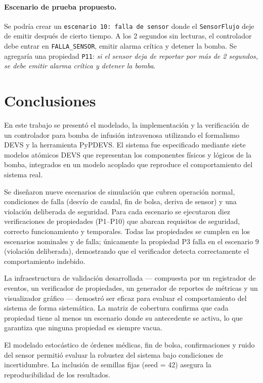 \documentclass[12pt,a4paper]{article}
\begin{document}
\paragraph{Escenario de prueba propuesto.}  Se podría crear un
\texttt{escenario 10: falla de sensor} donde el \texttt{SensorFlujo}
deje de emitir después de cierto tiempo.  A los 2 segundos sin
lecturas, el controlador debe entrar en \texttt{FALLA\_SENSOR},
emitir alarma crítica y detener la bomba.  Se agregaría una propiedad
\texttt{P11}: \textit{si el sensor deja de reportar por más de 2
segundos, se debe emitir alarma crítica y detener la bomba}.

\section{Conclusiones}

En este trabajo se presentó el modelado, la implementación y la
verificación de un controlador para bomba de infusión intravenosa
utilizando el formalismo DEVS y la herramienta PyPDEVS.  El sistema
fue especificado mediante siete modelos atómicos DEVS que representan
los componentes físicos y lógicos de la bomba, integrados en un modelo
acoplado que reproduce el comportamiento del sistema real.

Se diseñaron nueve escenarios de simulación que cubren operación
normal, condiciones de falla (desvío de caudal, fin de bolsa, deriva
de sensor) y una violación deliberada de seguridad.  Para cada
escenario se ejecutaron diez verificaciones de propiedades (P1--P10)
que abarcan requisitos de seguridad, correcto funcionamiento y
temporales.  Todas las propiedades se cumplen en los escenarios
nominales y de falla; únicamente la propiedad P3 falla en el
escenario 9 (violación deliberada), demostrando que el verificador
detecta correctamente el comportamiento indebido.

La infraestructura de validación desarrollada --- compuesta por un
registrador de eventos, un verificador de propiedades, un generador
de reportes de métricas y un visualizador gráfico --- demostró ser
eficaz para evaluar el comportamiento del sistema de forma
sistemática.  La matriz de cobertura confirma que cada propiedad tiene
al menos un escenario donde su antecedente se activa, lo que garantiza
que ninguna propiedad es siempre vacua.

El modelado estocástico de órdenes médicas, fin de bolsa,
confirmaciones y ruido del sensor permitió evaluar la robustez del
sistema bajo condiciones de incertidumbre.  La inclusión de semillas
fijas (seed = 42) asegura la reproducibilidad de los resultados.
\end{document}
